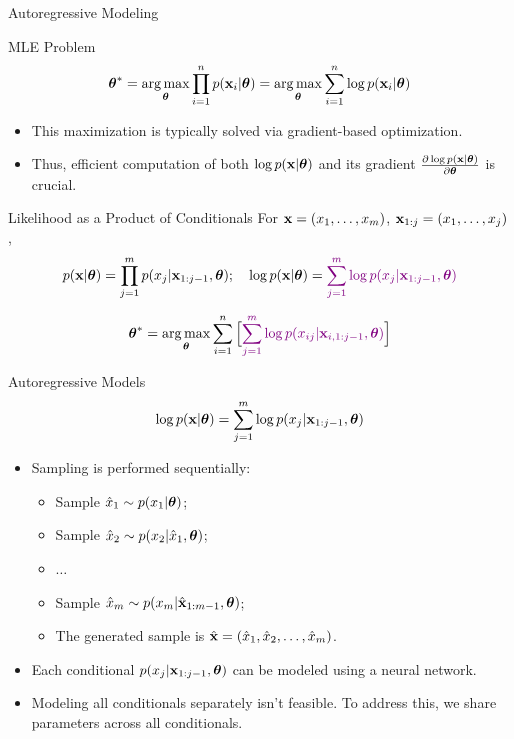 \documentclass{beamer}
\begin{document}
\begin{frame}{Autoregressive Modeling}
    \begin{block}{MLE Problem}
	    \vspace{-0.4cm}
	    $$
	        \boldsymbol{\theta}^* = \operatorname*{arg\,max}_{\boldsymbol{\theta}} \prod_{i=1}^n p(\mathbf{x}_i | \boldsymbol{\theta}) = \operatorname*{arg\,max}_{\boldsymbol{\theta}} \sum_{i=1}^n \log p(\mathbf{x}_i | \boldsymbol{\theta})
	    $$
	    \vspace{-0.5cm}
    \end{block}
    \eqpause
    \begin{itemize}
        \item This maximization is typically solved via gradient-based optimization.
        \item Thus, efficient computation of both $\log p(\mathbf{x} | \boldsymbol{\theta})$ and its gradient $\frac{\partial \log p(\mathbf{x} | \boldsymbol{\theta})}{\partial \boldsymbol{\theta}}$ is crucial.
    \end{itemize}
    \eqpause
    \begin{block}{Likelihood as a Product of Conditionals}
    For $\mathbf{x} = (x_1, \dots, x_m)$, $\mathbf{x}_{1:j} = (x_1, \dots, x_j)$,
    $$
        p(\mathbf{x} | \boldsymbol{\theta}) = \prod_{j=1}^m p(x_j | \mathbf{x}_{1:j - 1}, \boldsymbol{\theta});\quad
        \log p(\mathbf{x} | \boldsymbol{\theta}) = {\color{violet}\sum_{j=1}^m \log p(x_j | \mathbf{x}_{1:j - 1}, \boldsymbol{\theta})}
    $$
    \end{block}
    \eqpause
    \vspace{-0.5cm}
	 $$
	     \boldsymbol{\theta}^* =  \operatorname*{arg\,max}_{\boldsymbol{\theta}} \sum_{i=1}^n \Big[{\color{violet} \sum_{j=1}^m \log p(x_{ij} | \mathbf{x}_{i, 1:j - 1}, \boldsymbol{\theta})}\Big]
	 $$
\end{frame}
\begin{frame}{Autoregressive Models}
    \[
    	\log p(\mathbf{x}| \boldsymbol{\theta}) = \sum_{j=1}^m \log p(x_j | \mathbf{x}_{1:j - 1}, \boldsymbol{\theta})
    \]
    \eqpause
    \begin{itemize}
	    \item Sampling is performed sequentially:
	    \begin{itemize}
    		\item Sample $\hat{x}_1 \sim p(x_1 | \boldsymbol{\theta})$;
            \eqpause
    		\item Sample $\hat{x}_2 \sim p(x_2 | \hat{x}_1, \boldsymbol{\theta})$;
            \eqpause
    		\item $\ldots$
    		\item Sample $\hat{x}_m \sim p(x_m | \hat{\mathbf{x}}_{1:m-1}, \boldsymbol{\theta})$;
    		\item The generated sample is $\hat{\mathbf{x}} = (\hat{x}_1, \hat{x}_2, \ldots, \hat{x}_m)$.
    	\end{itemize}
        \eqpause
        \item Each conditional $p(x_j | \mathbf{x}_{1:j - 1}, \boldsymbol{\theta})$ can be modeled using a neural network.
        \eqpause
        \item Modeling all conditionals separately isn't feasible. To address this, we share parameters across all conditionals.
    \end{itemize}
\end{frame}
\end{document}
